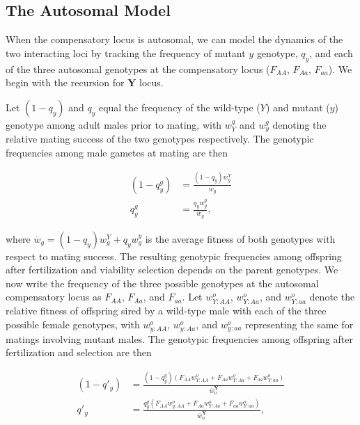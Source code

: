 \documentclass{article}
\begin{document}
\subsection{The Autosomal Model}

When the compensatory locus is autosomal, we can model the dynamics of the two interacting loci by tracking the frequency of mutant $y$ genotype, $q_{y}$, and each of the three autosomal genotypes at the compensatory locus ($F_{AA}$, $F_{Aa}$, $F_{aa}$). We begin with the recursion for $\mathbf{Y}$ locus. 

Let $(1 - q_y)$ and $q_{y}$ equal the frequency of the wild-type ($Y$) and mutant ($y$) genotype among adult males prior to mating, with $w_{Y}^{g}$ and $w_{y}^{g}$ denoting the relative mating success of the two genotypes respectively. The genotypic frequencies among male gametes at mating are then 

\begin{subequations}\begin{align} \label{eq:Auto-qg}
	(1 - q^{g}_{y}) &= \frac{ (1 - q_y)w^{Y}_{g} }{\overline{w}_g} \\
	q^{g}_{y}       &= \frac{ q_y w^{y}_{g} }{\overline{w}_g}, 
\end{align}\end{subequations}

where $\overline{w}_g = (1 - q_y)w^{Y}_{g} + q_y w^{y}_{g}$ is the average fitness of both genotypes with respect to mating success. The resulting genotypic frequencies among offspring after fertilization and viability selection depends on the parent genotypes. We now write the frequency of the three possible genotypes at the autosomal compensatory locus as $F_{AA}$, $F_{Aa}$, and $F_{aa}$. Let $w^{o}_{Y:AA}$, $w^{o}_{Y:Aa}$, and $w^{o}_{Y:aa}$ denote the relative fitness of offspring sired by a wild-type male with each of the three possible female genotypes, with $w^{o}_{y:AA}$, $w^{o}_{y:Aa}$, and $w^{o}_{y:aa}$ representing the same for matings involving mutant males. The genotypic frequencies among offspring after fertilization and selection are then

\begin{subequations} \begin{align} 
	(1 - q'_{y}) &= \frac{ (1 - q^{g}_{y}) (F_{AA} w^{o}_{Y:AA} + F_{Aa} w^{o}_{Y:Aa} + F_{aa} w^{o}_{Y:aa}) }{\overline{w}^{\mathbf{Y}}_o} \label{eq:Auto-qPr1} \\ 
	q'_{y} &= \frac{ q^{g}_{y} (F_{AA} w^{o}_{y:AA} + F_{Aa} w^{o}_{Y:Aa} + F_{aa} w^{o}_{Y:aa}) }{\overline{w}^{\mathbf{Y}}_o}, \label{eq:Auto-qPr2} 
\end{align}\end{subequations}
\end{document}
